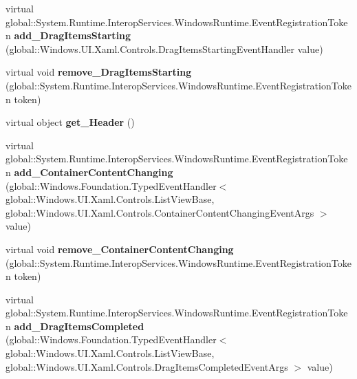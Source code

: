 \begin{DoxyCompactItemize}
virtual global\+::\+System.\+Runtime.\+Interop\+Services.\+Windows\+Runtime.\+Event\+Registration\+Token {\bfseries add\+\_\+\+Drag\+Items\+Starting} (global\+::\+Windows.\+U\+I.\+Xaml.\+Controls.\+Drag\+Items\+Starting\+Event\+Handler value)
\item 
\mbox{\label{class_windows_1_1_u_i_1_1_xaml_1_1_controls_1_1_list_view_base_ad3ae84be415d5e14b9ab060cec7ced16}} 
virtual void {\bfseries remove\+\_\+\+Drag\+Items\+Starting} (global\+::\+System.\+Runtime.\+Interop\+Services.\+Windows\+Runtime.\+Event\+Registration\+Token token)
\item 
\mbox{\label{class_windows_1_1_u_i_1_1_xaml_1_1_controls_1_1_list_view_base_a23229b9cd6ccf8c31885dc9594c5df62}} 
virtual object {\bfseries get\+\_\+\+Header} ()
\item 
\mbox{\label{class_windows_1_1_u_i_1_1_xaml_1_1_controls_1_1_list_view_base_ac03683b52f206ce90a2d5585d50835c9}} 
virtual global\+::\+System.\+Runtime.\+Interop\+Services.\+Windows\+Runtime.\+Event\+Registration\+Token {\bfseries add\+\_\+\+Container\+Content\+Changing} (global\+::\+Windows.\+Foundation.\+Typed\+Event\+Handler$<$ global\+::\+Windows.\+U\+I.\+Xaml.\+Controls.\+List\+View\+Base, global\+::\+Windows.\+U\+I.\+Xaml.\+Controls.\+Container\+Content\+Changing\+Event\+Args $>$ value)
\item 
\mbox{\label{class_windows_1_1_u_i_1_1_xaml_1_1_controls_1_1_list_view_base_a1a4b1610e748210c7c253306be557396}} 
virtual void {\bfseries remove\+\_\+\+Container\+Content\+Changing} (global\+::\+System.\+Runtime.\+Interop\+Services.\+Windows\+Runtime.\+Event\+Registration\+Token token)
\item 
\mbox{\label{class_windows_1_1_u_i_1_1_xaml_1_1_controls_1_1_list_view_base_a4071ecc43776f01b4394b7e08cf5d353}} 
virtual global\+::\+System.\+Runtime.\+Interop\+Services.\+Windows\+Runtime.\+Event\+Registration\+Token {\bfseries add\+\_\+\+Drag\+Items\+Completed} (global\+::\+Windows.\+Foundation.\+Typed\+Event\+Handler$<$ global\+::\+Windows.\+U\+I.\+Xaml.\+Controls.\+List\+View\+Base, global\+::\+Windows.\+U\+I.\+Xaml.\+Controls.\+Drag\+Items\+Completed\+Event\+Args $>$ value)

\end{DoxyCompactItemize}

